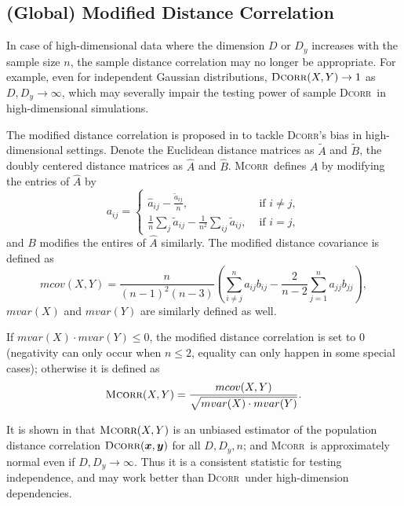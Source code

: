 \documentclass[11pt]{article}
\newcommand{\note}[2][]{\added[#1,remark={#2}]{}}
\providecommand{\sct}[1]{{\normalfont\textsc{#1}}}
\providecommand{\mb}[1]{\boldsymbol{#1}}
\newcommand{\Dcorr}{\sct{Dcorr}}
\newcommand{\Mcorr}{\sct{Mcorr}}
\newcommand{\cs}[1]{{\note{cs: #1}}}
\begin{document}
\cs{don't we have a lemma here? also, explain why we left center vs right center (ie, for symmetry)}

\subsection{(Global) Modified Distance Correlation}
\label{appen:mcorr}
In case of high-dimensional data where the dimension $D$ or $D_y$ increases with the sample size $n$, the sample distance correlation may no longer be appropriate. For example, even for independent Gaussian distributions, $\Dcorr(X,Y) \rightarrow 1$ as $D, D_y \rightarrow \infty$, which may severally impair the testing power of sample \Dcorr~in high-dimensional simulations.

The modified distance correlation is proposed in \cite{SzekelyRizzo2013a} to tackle   \Dcorr's bias in high-dimensional settings. Denote the Euclidean distance matrices as $\tilde{A}$ and $\tilde{B}$, the doubly centered distance matrices as $\hat{A}$ and $\hat{B}$.  \Mcorr~defines $A$ by modifying the entries of $\hat{A}$ by
\[a_{ij} = \left\{
  \begin{array}{lr}
    \hat{a}_{ij}-\frac{\tilde{a}_{ij}}{n}, & \mbox{ if } i \neq j, \\
    \frac{1}{n}\sum_{j}\tilde{a}_{ij}-\frac{1}{n^2}\sum_{ij}\tilde{a}_{ij}, &\mbox{ if } i = j,
  \end{array}
\right.
\]
and  $B$ modifies the entires of $\hat{A}$ similarly.
The modified distance covariance is defined as
\begin{equation*}
mcov(X,Y)=\frac{n}{(n-1)^2(n-3)}\left(\sum_{i \neq j}^{n}a_{ij}b_{ij}-\frac{2}{n-2}\sum_{j=1}^{n}a_{jj}b_{jj}\right),
\end{equation*}
$mvar(X)$ and $mvar(Y)$ are similarly defined as well.

If $mvar(X) \cdot mvar(Y) \leq 0$, the modified distance correlation is set to $0$ (negativity can only occur when $n\leq 2$, equality can only happen in some special cases); otherwise it is defined as
\begin{equation*}
\Mcorr(X,Y)=\frac{mcov(X,Y)}{\sqrt{mvar(X) \cdot mvar(Y)}}.
\end{equation*}

It is shown in \cite{SzekelyRizzo2013a} that $\Mcorr(X,Y)$ is an unbiased estimator of the population distance correlation $\Dcorr(\mb{x},\mb{y})$ for all $D, D_y, n$; and \Mcorr~is approximately normal even if $D,D_y \rightarrow \infty$. Thus it is a consistent statistic for testing independence, and may work better than \Dcorr~under high-dimension dependencies.
\end{document}
